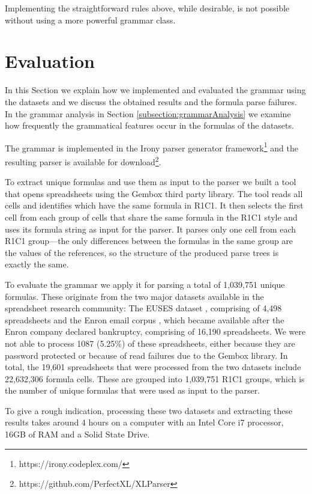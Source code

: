 \documentclass[conference]{IEEEtran}
\begin{document}
Implementing the straightforward rules above, while desirable, is not possible without using a more powerful grammar class.

\section{Evaluation}
\label{sec:evaluation}

In this Section we explain how we implemented and evaluated the grammar using the datasets and we discuss the obtained results and the formula parse failures. In the grammar analysis in Section \ref{subsection:grammarAnalysis} we examine how frequently the grammatical features occur in the formulas of the datasets.

The grammar is implemented in the Irony parser generator framework\footnote{https://irony.codeplex.com/} and the resulting parser is available for download\footnote{https://github.com/PerfectXL/XLParser}.

To extract unique formulas and use them as input to the parser we built a tool that opens spreadsheets using the Gembox third party library. The tool reads all cells and identifies which have the same formula in R1C1. It then selects the first cell from each group of cells that share the same formula in the R1C1 style and uses its formula string as input for the parser. It parses only one cell from each R1C1 group---the only differences between the formulas in the same group are the values of the references, so the structure of the produced parse trees is exactly the same.

To evaluate the grammar we apply it for parsing a total of 1,039,751 unique formulas. These originate from the two major datasets available in the spreadsheet research community: The EUSES dataset \cite{euses}, comprising of 4,498 spreadsheets and the Enron email corpus \cite{enron}, which became available after the Enron company declared bankruptcy, comprising of 16,190 spreadsheets. We were not able to process 1087 (5.25\%) of these spreadsheets, either because they are password protected or because of read failures due to the Gembox library. In total, the 19,601 spreadsheets that were processed from the two datasets include 22,632,306 formula cells. These are grouped into 1,039,751 R1C1 groups, which is the number of unique formulas that were used as input to the parser.

To give a rough indication, processing these two datasets and extracting these results takes around 4 hours on a computer with an Intel Core i7 processor, 16GB of RAM and a Solid State Drive.
\end{document}
